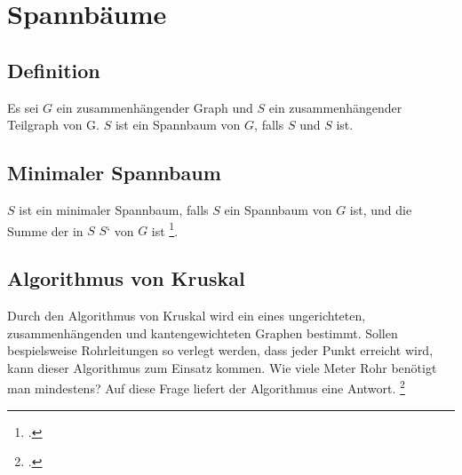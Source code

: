 \documentclass{lehramt-informatik-haupt}
\begin{document}

\chapter{Spannbäume}

%

\section{Definition}

Es sei $G$ ein zusammenhängender Graph und $S$ ein zusammenhängender
Teilgraph von G. $S$ ist ein Spannbaum von $G$, falls $S$  und $S$  ist.

%

\section{Minimaler Spannbaum}

$S$ ist ein minimaler Spannbaum, falls $S$ ein Spannbaum von $G$ ist,
und die Summe der  in $S$  $S‘$ von $G$ ist
\footcite[Seite 29 (PDF 23)]{aud:fs:6}.

%

\section{Algorithmus von Kruskal}

Durch den Algorithmus von Kruskal wird ein 
eines ungerichteten, zusammenhängenden und kantengewichteten Graphen
bestimmt. Sollen bespielsweise Rohrleitungen so verlegt werden, dass
jeder Punkt erreicht wird, kann dieser Algorithmus zum Einsatz kommen.
Wie viele Meter Rohr benötigt man mindestens? Auf diese Frage liefert
der Algorithmus eine Antwort.
\footcite[Seite 30 (PDF 24)]{aud:fs:6}
\end{document}
